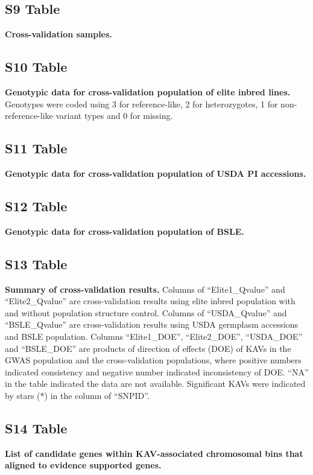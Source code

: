 \documentclass[10pt,letterpaper]{article}
\begin{document}
\subsection*{S9 Table}
\label{Table_S9}
{\bf Cross-validation samples.}

\subsection*{S10 Table}
\label{Table_S10}
{\bf Genotypic data for cross-validation population of elite inbred lines.} Genotypes were coded using 3 for reference-like, 2 for heterozygotes, 1 for non-reference-like variant types and 0 for missing.

\subsection*{S11 Table}
\label{Table_S11}
{\bf Genotypic data for cross-validation population of USDA PI accessions.}

\subsection*{S12 Table}
\label{Table_S12}
{\bf Genotypic data for cross-validation population of BSLE.}

\subsection*{S13 Table}
\label{Table_S13}
{\bf Summary of cross-validation results.} 
Columns of “Elite1\_Qvalue” and “Elite2\_Qvalue” are cross-validation results using elite inbred population with and without population structure control. Columns of “USDA\_Qvalue” and “BSLE\_Qvalue” are cross-validation results using USDA germplasm accessions and BSLE population. Columns “Elite1\_DOE”, “Elite2\_DOE”, “USDA\_DOE” and “BSLE\_DOE” are products of direction of effects (DOE) of KAVs in the GWAS population and the cross-validation populations, where positive numbers indicated consistency and negative number indicated inconsistency of DOE. “NA” in the table indicated the data are not available. Significant KAVs were indicated by stars ($\ast$) in the column of “SNPID”.

\subsection*{S14 Table}
\label{Table_S14}
{\bf List of candidate genes within KAV-associated chromosomal bins that aligned to evidence supported genes.}
\end{document}
